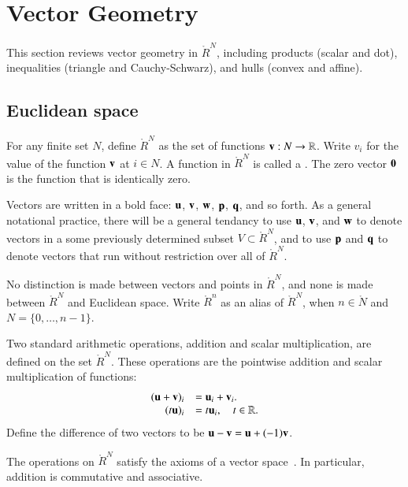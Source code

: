 \section{Vector Geometry}

This section reviews vector geometry in $\ring{R}^N$, including products (scalar and dot), inequalities (triangle and Cauchy-Schwarz), and hulls (convex and affine).  

\subsection{Euclidean space}

\begin{definition}
For any finite set $N$, define $\ring{R}^N$ as the set of functions
${\mathbf v}:N\to\mathbb{R}$. Write $v_i$ for the value of the function ${\mathbf v}$ at $i\in N$.
%
%
A function in $\ring{R}^N$ is called a .  
The zero vector ${\mathbf 0}$ is the function that is identically zero.  
%
\end{definition}
Vectors are written in a bold face:
${\mathbf u}$, ${\mathbf v}$, ${\mathbf w}$, ${\mathbf p}$, ${\mathbf q}$, and so forth.  As a general notational practice, there will be a general tendancy to use ${\mathbf u}$, ${\mathbf v}$, and ${\mathbf w}$  to denote vectors in a some previously determined subset $V\subset \ring{R}^N$, and to use ${\mathbf p}$ and ${\mathbf q}$ to denote vectors   that run without restriction over all of $\ring{R}^N$.

No distinction is made between
vectors and points in $\ring{R}^N$, and none is made between $\ring{R}^N$ and Euclidean space.
Write $\ring{R}^n$ as an alias of $\ring{R}^N$, 
when $n\in\ring{N}$ and $N=\{0,\ldots,n-1\}$.  

\begin{definition}
Two standard arithmetic operations, addition and scalar multiplication, are defined on
the set $\ring{R}^N$.  These operations are  the pointwise addition 
and scalar multiplication of functions:
    \begin{equation}
      \begin{array}{rll}
    ({\mathbf u} + {\mathbf v})_i &= {\mathbf u}_i + {\mathbf v}_i.\\
    (t {\mathbf u})_i &= t {\mathbf u}_i,\quad t\in\mathbb{R}.\\
    \end{array}
    \end{equation}
%
%
Define the difference of two vectors to be ${\mathbf u} - {\mathbf v} = {\mathbf u} + (-1) {\mathbf v}$.
%
\end{definition}
The operations on $\ring{R}^N$ 
satisfy the axioms of a vector space~\cite{unknown}. %
In particular, addition is commutative and associative.


